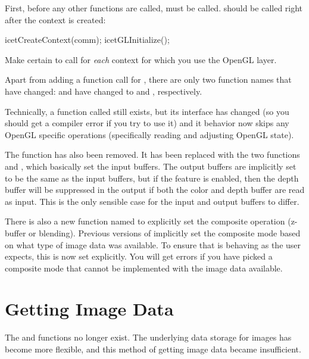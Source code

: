 First, before any other  functions are called,
 must be called.   should
be called right after the context is created:
\begin{code}
icetCreateContext(comm);
icetGLInitialize();
\end{code}

Make certain to call  for \emph{each} context for
which you use the OpenGL layer.

Apart from adding a function call for , there are
only two function names that have changed:
 and  have
changed to  and ,
respectively.

Technically, a function called  still exists, but its
interface has changed (so you should get a compiler error if you try to use
it) and it behavior now skips any OpenGL specific operations (specifically
reading and adjusting OpenGL state).

The function 
has also been removed.  It has been replaced with the two functions
 and , which basically
set the input buffers.  The output buffers are implicitly set to be the
same as the input buffers, but if the 
feature is enabled, then the depth buffer will be suppressed in the output
if both the color and depth buffer are read as input.  This is the only
sensible case for the input and output buffers to differ.

There is also a new function named  to explicitly
set the composite operation (z-buffer or blending).  Previous versions of
\IceT implicitly set the composite mode based on what type of image data
was available.  To ensure that \IceT is behaving as the user expects, this
is now set explicitly.  You will get errors if you have picked a composite
mode that cannot be implemented with the image data available.

\section{Getting Image Data}
\label{sec:Transitioning:Getting_Image_Data}

The  and
 functions no longer
exist.  The underlying data storage for images has become more flexible,
and this method of getting image data became insufficient.


